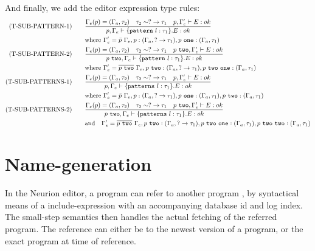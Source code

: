 \documentclass[10pt,a4paper,english]{article}
\begin{document}
And finally, we add the editor expression type rules:
\begin{align}
  (\text{T-SUB-PATTERN-1})\qquad
&\frac{\Gamma_{e}(p) = (\Gamma_{a},\tau_2) \quad \tau_2\sim?\to\tau_1 \quad p,\Gamma_{e}' \vdash E : ok}{p,\Gamma_{e} \vdash \{\texttt{pattern}~l : \tau_1\}.E : ok}\\
&\text{where}~\Gamma_{e}' = \bar{p}~\Gamma_{e}, p : (\Gamma_{a}, ?\to\tau_1), p~\texttt{one} : (\Gamma_{a}, \tau_1)\\
  (\text{T-SUB-PATTERN-2})\qquad
&\frac{\Gamma_{e}(p) = (\Gamma_{a},\tau_2) \quad \tau_2\sim?\to\tau_1 \quad p~\texttt{two},\Gamma_{e}' \vdash E : ok}{p~\texttt{two},\Gamma_{e} \vdash \{\texttt{pattern}~l : \tau_1\}.E : ok}\\
&\text{where}~\Gamma_{e}' = \overline{p~\texttt{two}}~\Gamma_{e}, p~\texttt{two} : (\Gamma_{a}, ?\to\tau_1), p~\texttt{two}~\texttt{one} : (\Gamma_{a}, \tau_1)\\
  (\text{T-SUB-PATTERNS-1})\qquad
&\frac{\Gamma_{e}(p) = (\Gamma_{a},\tau_2) \quad \tau_2\sim?\to\tau_1 \quad p,\Gamma_{e}' \vdash E : ok}{p,\Gamma_{e} \vdash \{\texttt{patterns}~l : \tau_1\}.E : ok}\\
&\text{where}~\Gamma_{e}' = \bar{p}~\Gamma_{e}, p : (\Gamma_{a}, ?\to\tau_1), p~\texttt{one} : (\Gamma_{a}, \tau_1), p~\texttt{two} : (\Gamma_{a},\tau_1)\\
  (\text{T-SUB-PATTERNS-2})\qquad
&\frac{\Gamma_{e}(p) = (\Gamma_{a},\tau_2) \quad \tau_2\sim?\to\tau_1 \quad p~\texttt{two},\Gamma_{e}' \vdash E : ok}{p~\texttt{two},\Gamma_{e} \vdash \{\texttt{patterns}~l : \tau_1\}.E : ok}\\
&\text{and}~~~\Gamma_{e}' = \overline{p~\texttt{two}}~\Gamma_{e}, p~\texttt{two} : (\Gamma_{a}, ?\to\tau_1), p~\texttt{two}~\texttt{one} : (\Gamma_{a}, \tau_1), p~\texttt{two}~\texttt{two} : (\Gamma_{a},\tau_1)
\end{align}



\newpage

\section{Name-generation}
In the Neurion editor, a program can refer to another program , by syntactical
means of a include-expression with an accompanying database id and log index.
The small-step semantics then handles the actual fetching of the referred
program. The reference can either be to the newest version of a program, or the
exact program at time of reference.
\end{document}
